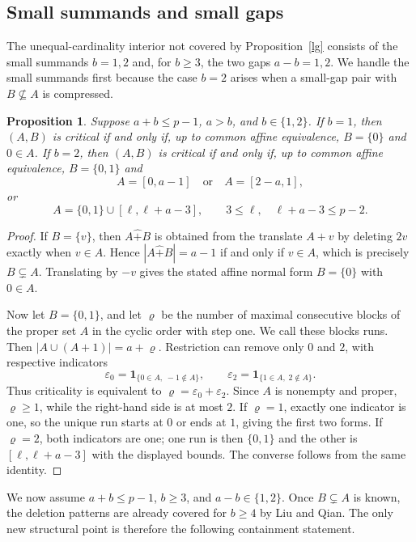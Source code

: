 \documentclass[12pt]{article}
\newtheorem{proposition}{Proposition}[section]
\theoremstyle{remark}
\newcommand{\rs}{\mathbin{\widehat+}}
\newcommand{\ind}{\mathbf 1}
\begin{document}
\subsection{Small summands and small gaps}\label{smallgapinterior}

The unequal-cardinality interior not covered by Proposition~\ref{lg}
consists of the small summands $b=1,2$ and, for $b\ge3$, the two gaps
$a-b=1,2$.  We handle the small summands first because the case $b=2$
arises when a small-gap pair with $B\nsubseteq A$ is compressed.

\begin{proposition}\label{smallcard}
Suppose $a+b\le p-1$, $a>b$, and $b\in\{1,2\}$.  If $b=1$, then
$(A,B)$ is critical if and only if, up to common affine equivalence,
$B=\{0\}$ and $0\in A$.  If $b=2$, then $(A,B)$ is critical if and
only if, up to common affine equivalence, $B=\{0,1\}$ and
\[
 A=[0,a-1]\quad\text{or}\quad A=[2-a,1],
\]
or
\[
 A=\{0,1\}\cup[\ell,\ell+a-3],
 \qquad 3\le\ell,\quad \ell+a-3\le p-2.
\]
\end{proposition}
\begin{proof}
If $B=\{v\}$, then $A\rs B$ is obtained from the translate $A+v$ by
deleting $2v$ exactly when $v\in A$.  Hence
$|A\rs B|=a-1$ if and only if $v\in A$, which is precisely $B\subsetneq A$.  Translating by $-v$ gives the
stated affine normal form $B=\{0\}$ with $0\in A$.

Now let $B=\{0,1\}$, and let $\varrho$ be the number of maximal
consecutive blocks of the proper set $A$ in the cyclic order with
step one.  We call these blocks runs.  Then
$|A\cup(A+1)|=a+\varrho$.  Restriction can remove only $0$ and $2$,
with respective indicators
\[
 \varepsilon_0=\ind_{\{0\in A,\;-1\notin A\}},\qquad
 \varepsilon_2=\ind_{\{1\in A,\;2\notin A\}}.
\]
Thus criticality is equivalent to $\varrho=\varepsilon_0+\varepsilon_2$.
Since $A$ is nonempty and proper, $\varrho\ge1$, while the right-hand
side is at most $2$.  If $\varrho=1$, exactly one indicator is one, so
the unique run starts at $0$ or ends at $1$, giving the first two forms.
If $\varrho=2$, both indicators are one; one run is then $\{0,1\}$ and
the other is $[\ell,\ell+a-3]$ with the displayed bounds.  The converse
follows from the same identity.
\end{proof}

We now assume $a+b\le p-1$, $b\ge3$, and $a-b\in\{1,2\}$.
Once $B\subsetneq A$ is known, the deletion patterns are already covered
for $b\ge4$ by Liu and Qian.  The only new structural point is therefore
the following containment statement.
\end{document}
